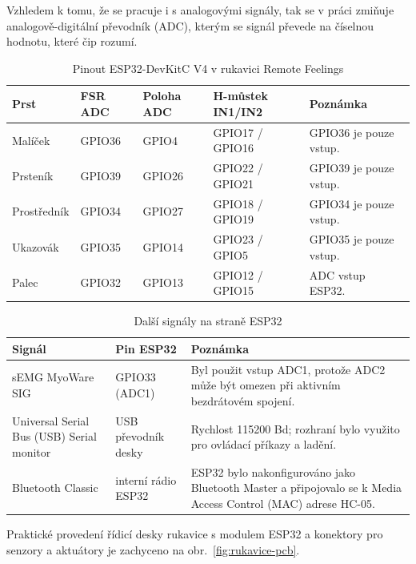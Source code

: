 \documentclass[FZS,DP]{tulthesis}
\begin{document}
Vzhledem k tomu, že se pracuje i s analogovými signály, tak se 
v práci zmiňuje analogově-digitální převodník (ADC), kterým se signál převede na číselnou hodnotu, které čip rozumí. 
\begin{table}[H]
\centering
\caption{Pinout ESP32-DevKitC V4 v rukavici Remote Feelings}
\label{tab:pinout-esp32}
\begin{tabular}{|p{}|p{}|p{}|p{}|p{}|}
\hline
\textbf{Prst} & \textbf{FSR ADC} & \textbf{Poloha ADC} & \textbf{H-můstek IN1/IN2} & \textbf{Poznámka} \\
\hline
Malíček & GPIO36 & GPIO4 & GPIO17 / GPIO16 & GPIO36 je pouze vstup. \\
\hline
Prsteník & GPIO39 & GPIO26 & GPIO22 / GPIO21 & GPIO39 je pouze vstup. \\
\hline
Prostředník & GPIO34 & GPIO27 & GPIO18 / GPIO19 & GPIO34 je pouze vstup. \\
\hline
Ukazovák & GPIO35 & GPIO14 & GPIO23 / GPIO5 & GPIO35 je pouze vstup. \\
\hline
Palec & GPIO32 & GPIO13 & GPIO12 / GPIO15 & ADC vstup ESP32. \\
\hline
\end{tabular}
\end{table}

\begin{table}[H]
\centering
\caption{Další signály na straně ESP32}
\label{tab:pinout-esp32-dalsi}
\begin{tabular}{|p{}|p{}|p{}|}
\hline
\textbf{Signál} & \textbf{Pin ESP32} & \textbf{Poznámka} \\
\hline
sEMG MyoWare SIG & GPIO33 (ADC1) & Byl použit vstup ADC1, protože ADC2 může být omezen při aktivním bezdrátovém spojení. \\
\hline
Universal Serial Bus (USB) Serial monitor & USB převodník desky & Rychlost 115200 Bd; rozhraní bylo využito pro ovládací příkazy a ladění. \\
\hline
Bluetooth Classic & interní rádio ESP32 & ESP32 bylo nakonfigurováno jako Bluetooth Master a připojovalo se k Media Access Control (MAC) adrese HC-05. \\
\hline
\end{tabular}
\end{table}

Praktické provedení řídicí desky rukavice s modulem ESP32 a konektory pro senzory a aktuátory je zachyceno na obr.~\ref{fig:rukavice-pcb}.
\end{document}
